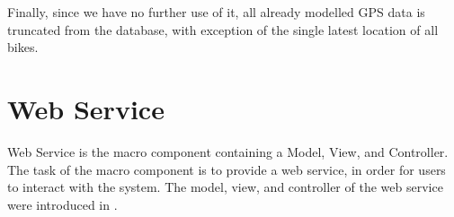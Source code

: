 Finally, since we have no further use of it, all already modelled GPS data is truncated from the database, with exception of the single latest location of all bikes.

\section{Web Service}\label{arch:webservice}
Web Service is the macro component containing a Model, View, and Controller.
The task of the macro component is to provide a web service, in order for users to interact with the system.
The model, view, and controller of the web service were introduced in .
